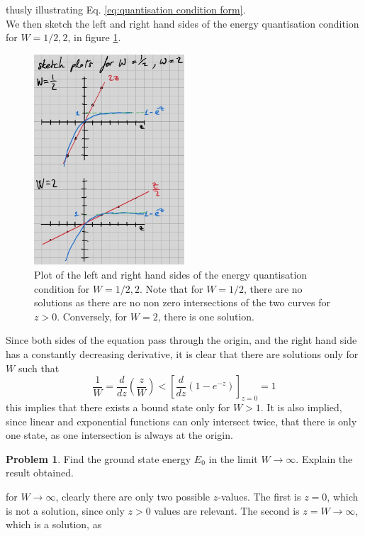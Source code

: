 \documentclass{article}
\theoremstyle{definition}
\newtheorem{definition}{Problem}[section]
\theoremstyle{remark}
\begin{document}
thusly illustrating Eq. \ref{eq:quantisation condition form}.\\
\indent We then sketch the left and right hand sides of the energy quantisation condition for $W=1/2, 2$, in figure \ref{fig: quantisation}.\\
\begin{figure}[H]
    \centering
    \includegraphics[width=0.5\textwidth]{quantisation_condition_plot.jpg}
    \caption{\label{fig: quantisation}Plot of the left and right hand sides of the energy quantisation condition for $W=1/2, 2$. Note that for $W=1/2$, there are no solutions as there are no non zero intersections of the two curves for $z>0$. Conversely, for $W=2$, there is one solution.}
\end{figure}
Since both sides of the equation pass through the origin, and the right hand side has a constantly decreasing derivative, it is clear that there are solutions only for $W$ such that 
\begin{equation*}
    \frac{1}{W} = \frac{d}{dz}\left(\frac{z}{W}\right) < \left[\frac{d}{dz}\left(1-e^{-z}\right)\right]_{z=0} = 1
\end{equation*}
this implies that there exists a bound state only for $W>1$. It is also implied, since linear and exponential functions can only intersect twice, that there is only one state, as one intersection is always at the origin.\\
\begin{definition}
    Find the ground state energy $E_0$ in the limit $W\rightarrow\infty$. Explain the result obtained.
\end{definition}
for $W\rightarrow\infty$, clearly there are only two possible $z$-values. The first is $z=0$, which is not a solution, since only $z>0$ values are relevant. The second is $z=W\rightarrow\infty$, which is a solution, as
\end{document}
